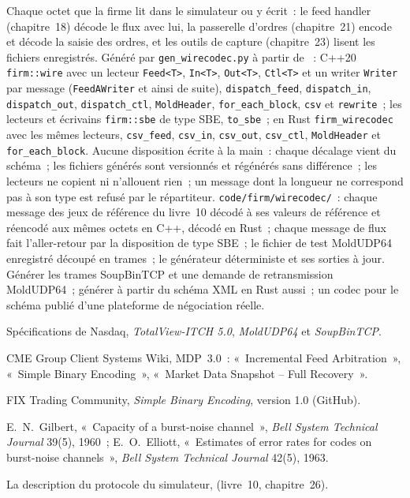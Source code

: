 \begin{build}
 Chaque octet que la firme lit dans le simulateur ou y écrit~: le feed handler (chapitre~18) décode le flux
avec lui, la passerelle d'ordres (chapitre~21) encode et décode la saisie des ordres, et les outils de capture (chapitre~23) lisent les
fichiers enregistrés.
 Généré par \texttt{gen\_wirecodec.py} à partir de ~: C++20
\texttt{firm::wire} avec un lecteur \texttt{Feed<T>}, \texttt{In<T>}, \texttt{Out<T>}, \texttt{Ctl<T>} et un writer
\texttt{Writer} par message (\texttt{FeedAWriter} et ainsi de suite), \texttt{dispatch\_feed}, \texttt{dispatch\_in}, \texttt{dispatch\_out},
\texttt{dispatch\_ctl}, \texttt{MoldHeader}, \texttt{for\_each\_block}, \texttt{csv} et \texttt{rewrite}~; les
lecteurs et écrivains \texttt{firm::sbe} de type SBE, \texttt{to\_sbe}~; en Rust \texttt{firm\_wirecodec} avec les mêmes
lecteurs, \texttt{csv\_feed}, \texttt{csv\_in}, \texttt{csv\_out}, \texttt{csv\_ctl}, \texttt{MoldHeader} et \texttt{for\_each\_block}.
 Aucune disposition écrite à la main~: chaque décalage vient du schéma~; les fichiers générés sont versionnés et régénérés
sans différence~; les lecteurs ne copient ni n'allouent rien~; un message dont la longueur ne correspond pas à son type est refusé par
le répartiteur.
 \texttt{code/firm/wirecodec/}~: chaque message des jeux de référence du livre~10 décodé à ses
valeurs de référence et réencodé aux mêmes octets en C++, décodé en Rust~; chaque message de flux fait l'aller-retour par la disposition de type SBE~;
le fichier de test MoldUDP64 enregistré découpé en trames~; le générateur déterministe et ses sorties à jour.
 Générer les trames SoupBinTCP et une demande de retransmission MoldUDP64~; générer à partir du schéma XML en Rust
aussi~; un codec pour le schéma publié d'une plateforme de négociation réelle.
\end{build}

\begin{omsources}
\item Spécifications de Nasdaq, \emph{TotalView-ITCH 5.0}, \emph{MoldUDP64} et \emph{SoupBinTCP}.
\item CME Group Client Systems Wiki, MDP~3.0~: «~Incremental Feed Arbitration~», «~Simple Binary Encoding~», «~Market Data
Snapshot -- Full Recovery~».
\item FIX Trading Community, \emph{Simple Binary Encoding}, version 1.0 (GitHub).
\item E.~N.~Gilbert, «~Capacity of a burst-noise channel~», \emph{Bell System Technical Journal} 39(5), 1960~; E.~O.~Elliott,
«~Estimates of error rates for codes on burst-noise channels~», \emph{Bell System Technical Journal} 42(5), 1963.
\item La description du protocole du simulateur,  (livre~10, chapitre~26).
\end{omsources}

